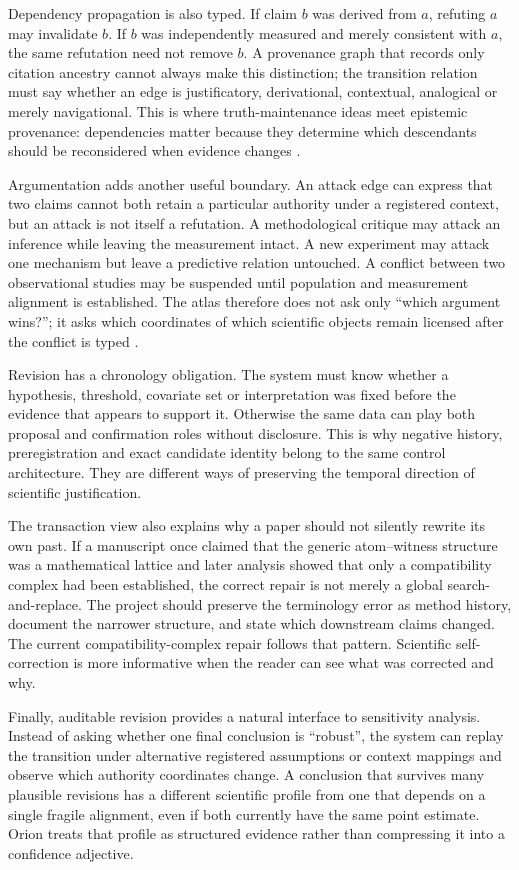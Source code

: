 Dependency propagation is also typed. If claim \(b\) was derived from \(a\), refuting \(a\) may invalidate \(b\). If \(b\) was independently measured and merely consistent with \(a\), the same refutation need not remove \(b\). A provenance graph that records only citation ancestry cannot always make this distinction; the transition relation must say whether an edge is justificatory, derivational, contextual, analogical or merely navigational. This is where truth-maintenance ideas meet epistemic provenance: dependencies matter because they determine which descendants should be reconsidered when evidence changes \cite{doyle1979,dekleer1986}.

Argumentation adds another useful boundary. An attack edge can express that two claims cannot both retain a particular authority under a registered context, but an attack is not itself a refutation. A methodological critique may attack an inference while leaving the measurement intact. A new experiment may attack one mechanism but leave a predictive relation untouched. A conflict between two observational studies may be suspended until population and measurement alignment is established. The atlas therefore does not ask only ``which argument wins?''; it asks which coordinates of which scientific objects remain licensed after the conflict is typed \cite{dung1995}.

Revision has a chronology obligation. The system must know whether a hypothesis, threshold, covariate set or interpretation was fixed before the evidence that appears to support it. Otherwise the same data can play both proposal and confirmation roles without disclosure. This is why negative history, preregistration and exact candidate identity belong to the same control architecture. They are different ways of preserving the temporal direction of scientific justification.

The transaction view also explains why a paper should not silently rewrite its own past. If a manuscript once claimed that the generic atom--witness structure was a mathematical lattice and later analysis showed that only a compatibility complex had been established, the correct repair is not merely a global search-and-replace. The project should preserve the terminology error as method history, document the narrower structure, and state which downstream claims changed. The current compatibility-complex repair follows that pattern. Scientific self-correction is more informative when the reader can see what was corrected and why.

Finally, auditable revision provides a natural interface to sensitivity analysis. Instead of asking whether one final conclusion is ``robust'', the system can replay the transition under alternative registered assumptions or context mappings and observe which authority coordinates change. A conclusion that survives many plausible revisions has a different scientific profile from one that depends on a single fragile alignment, even if both currently have the same point estimate. Orion treats that profile as structured evidence rather than compressing it into a confidence adjective.

